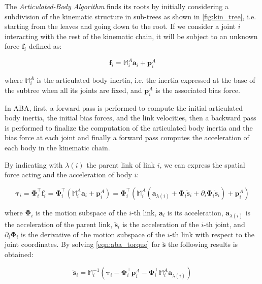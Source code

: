 The \textit{Articulated-Body Algorithm} \citep{featherstone_rigid_2008} finds its roots by initially considering a subdivision of the kinematic structure in sub-trees as shown in \cref{fig:kin_tree}, i.e. starting from the leaves and going down to the root. If we consider a joint $i$ interacting with the rest of the kinematic chain, it will be subject to an unknown force $\mathbf{f} _i$ defined as:

\begin{equation}
    \label{eqn:biasforce}
    \mathbf{f} _i = \mathbb{M} _i ^A \mathbf{a} _i + \mathbf{p} ^A _i
\end{equation}

where $\mathbb{M} _i ^A$ is the articulated body inertia, i.e. the inertia expressed at the base of the subtree when all its joints are fixed, and $\mathbf{p} ^A _i$ is the associated bias force.

In ABA, first, a forward pass is performed to compute the initial articulated body inertia, the initial bias forces, and the link velocities, then a backward pass is performed to finalize the computation of the articulated body inertia and the bias force at each joint and finally a forward pass computes the acceleration of each body in the kinematic chain.

By indicating with $\lambda(i)$ the parent link of link $i$, we can express the spatial force acting and the acceleration of body $i$:

\begin{equation}
    \label{eqn:aba_torque}
    \boldsymbol{\tau} _i = \boldsymbol{\Phi} ^\top _i \mathbf{f} _i = \boldsymbol{\Phi} ^\top _i (\mathbb{M} _i ^A \mathbf{a} _i + \mathbf{p} ^A _i) = \boldsymbol{\Phi} ^\top _i (\mathbb{M} _i ^A (\mathbf{a} _{\lambda(i)} + \boldsymbol{\Phi} _i \ddot{\mathbf{s}} _i + \partial_i \boldsymbol{\Phi} _i \dot{\mathbf{s}} _i)+ \mathbf{p} ^A _i)
\end{equation}

where $\boldsymbol{\Phi} _i$ is the motion subspace of the $i$-th link, $\mathbf{a} _i$ is its acceleration, $\mathbf{a} _{\lambda(i)}$ is the acceleration of the parent link, $\ddot{\mathbf{s}} _i$ is the acceleration of the $i$-th joint, and $\partial_i \boldsymbol{\Phi} _i$ is the derivative of the motion subspace of the $i$-th link with respect to the joint coordinates.
By solving \cref{eqn:aba_torque} for $\ddot{\mathbf{s}}$ the following results is obtained:

\begin{equation}
    \ddot{\mathbf{s}} _i = \mathbb{M} _i ^{-1} (\boldsymbol{\tau} _i - \boldsymbol{\Phi} ^\top _i \mathbf{p} ^A _i - \boldsymbol{\Phi} ^\top _i \mathbb{M} _i ^A \mathbf{a} _{\lambda(i)})
\end{equation}

